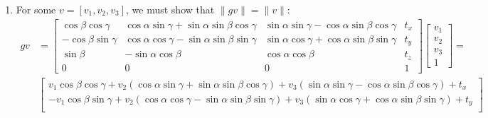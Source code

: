 \documentclass[12pt]{article}
\begin{document}
\begin{enumerate}
\begin{align*}
\begin{bmatrix}
	-\cos\beta \sin\gamma & \cos\alpha \cos\gamma - \sin\alpha \sin\beta \sin\gamma & \sin\alpha \cos\gamma + \cos\alpha \sin\beta \sin\gamma & 0 \\
	\sin\beta & -\sin\alpha \cos\beta & \cos\alpha\cos\beta & 0 \\
	0 & 0 & 0 & 1 \end{bmatrix} \\
	&= \begin{bmatrix} \cos\beta \cos\gamma & \cos\alpha \sin\gamma+ \sin\alpha \sin\beta \cos\gamma & \sin\alpha \sin\gamma - \cos\alpha \sin\beta \cos\gamma & t_x \\
	-\cos\beta \sin\gamma & \cos\alpha \cos\gamma - \sin\alpha \sin\beta \sin\gamma & \sin\alpha \cos\gamma + \cos\alpha \sin\beta \sin\gamma & t_y \\
	\sin\beta & -\sin\alpha \cos\beta & \cos\alpha\cos\beta & t_z \\
	0 & 0 & 0 & 1 \end{bmatrix}
	\end{align*}
	\item[(a)] For some $v = [v_1, v_2, v_3]$, we must show that $\|gv\| = \|v\|$:
	\begin{align*}
	gv &= \begin{bmatrix} \cos\beta \cos\gamma & \cos\alpha \sin\gamma + \sin\alpha \sin\beta \cos\gamma & \sin\alpha \sin\gamma - \cos\alpha \sin\beta \cos\gamma & t_x \\
	-\cos\beta \sin\gamma & \cos\alpha \cos\gamma - \sin\alpha \sin\beta \sin\gamma & \sin\alpha \cos\gamma + \cos\alpha \sin\beta \sin\gamma & t_y \\
	\sin\beta & -\sin\alpha \cos\beta & \cos\alpha\cos\beta & t_z \\
	0 & 0 & 0 & 1 \end{bmatrix} \begin{bmatrix} v_1 \\ v_2 \\ v_3 \\ 1 \end{bmatrix} = \\
	&\begin{bmatrix}
	v_1\cos\beta\cos\gamma + v_2 (\cos\alpha \sin\gamma + \sin\alpha \sin\beta \cos\gamma)  + v_3 (\sin\alpha \sin\gamma - \cos\alpha \sin\beta \cos\gamma) + t_x \\
	- v_1 \cos\beta \sin\gamma + v_2 (\cos\alpha \cos\gamma - \sin\alpha \sin\beta \sin\gamma) + v_3 ( \sin\alpha \cos\gamma + \cos\alpha \sin\beta \sin\gamma) + t_y \\

\end{bmatrix}
\end{align*}
\end{enumerate}
\end{document}
